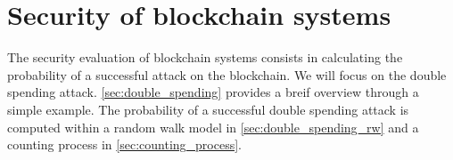\chapter{Security of blockchain systems}\label{chap:security}
The security evaluation of blockchain systems consists in calculating the probability of a successful attack on the blockchain. We will focus on the double spending attack. \cref{sec:double_spending} provides a breif overview through a simple example. The probability of a successful double spending attack is computed within a random walk model in \cref{sec:double_spending_rw} and a counting process in \cref{sec:counting_process}.

